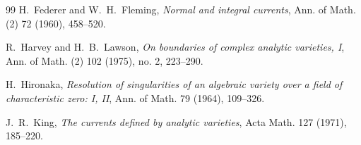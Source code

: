 \documentclass[11pt,a4paper]{article}
\theoremstyle{definition}
\begin{document}
\begin{thebibliography}{99}
H.~Federer and W.~H.~Fleming,
\emph{Normal and integral currents},
Ann. of Math. (2) 72 (1960), 458--520.

R.~Harvey and H.~B.~Lawson,
\emph{On boundaries of complex analytic varieties, I},
Ann. of Math. (2) 102 (1975), no. 2, 223--290.

H.~Hironaka,
\emph{Resolution of singularities of an algebraic variety over a field of characteristic zero: I, II},
Ann. of Math. 79 (1964), 109--326.

J.~R.~King,
\emph{The currents defined by analytic varieties},
Acta Math. 127 (1971), 185--220.
\end{thebibliography}
\end{document}
